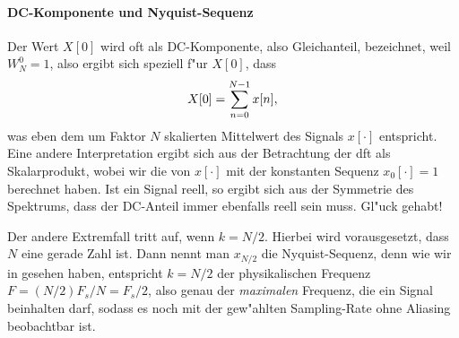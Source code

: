 \paragraph{DC-Komponente und Nyquist-Sequenz}
%
Der Wert $X[0]$ wird oft als DC-Komponente, also Gleichanteil, bezeichnet, weil $W_N^0 = 1$, also ergibt sich speziell f"ur $X[0]$, dass
\[
X[0] = {\sum\limits_{n = 0}^{N-1}{x[n]}},
\]
was eben dem um Faktor $N$ skalierten Mittelwert des Signals $x[\cdot]$ entspricht.
Eine andere Interpretation ergibt sich aus der Betrachtung der \gls{dft} als Skalarprodukt, wobei wir die  von $x[\cdot]$ mit der konstanten Sequenz $x_0[\cdot] = 1$ berechnet haben.
Ist ein Signal reell, so ergibt sich aus der Symmetrie des Spektrums, dass der DC-Anteil immer ebenfalls reell sein muss.
Gl"uck gehabt!

Der andere Extremfall tritt auf, wenn $k=N/2$. Hierbei wird vorausgesetzt, dass $N$ eine gerade Zahl ist.
Dann nennt man $x_{N/2}$ die Nyquist-Sequenz, denn wie wir in  gesehen haben, entspricht $k=N/2$ der physikalischen Frequenz $F = (N/2) F_s / N = F_s/2$, also genau der \emph{maximalen} Frequenz, die ein Signal beinhalten darf, sodass es noch mit der gew"ahlten Sampling-Rate ohne Aliasing beobachtbar ist.
%
